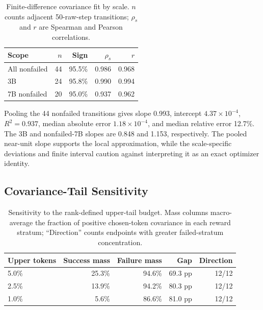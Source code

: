 \documentclass[letterpaper]{article}
\begin{document}
\begin{table}[t]
\centering
\small
\setlength{\tabcolsep}{3.1pt}
\begin{tabular*}{\columnwidth}{@{\extracolsep{\fill}}lrrrr}
\toprule
Scope & \(n\) & Sign & \(\rho_s\) & \(r\)\\
\midrule
All nonfailed & 44 & 95.5\% & 0.986 & 0.968\\
3B & 24 & 95.8\% & 0.990 & 0.994\\
7B nonfailed & 20 & 95.0\% & 0.937 & 0.962\\
\bottomrule
\end{tabular*}
\caption{Finite-difference covariance fit by scale.  \(n\) counts adjacent
50-raw-step transitions; \(\rho_s\) and \(r\) are Spearman and Pearson
correlations.}
\label{tab:sup-cov-fit}
\end{table}

Pooling the 44 nonfailed transitions gives slope 0.993, intercept
\(4.37\times10^{-4}\), \(R^2=0.937\), median absolute error
\(1.18\times10^{-4}\), and median relative error 12.7\%.  The 3B and
nonfailed-7B slopes are 0.848 and 1.153, respectively.  The pooled near-unit
slope supports the local approximation, while the scale-specific deviations
and finite interval caution against interpreting it as an exact optimizer
identity.

\subsection{Covariance-Tail Sensitivity}

\begin{table}[t]
\centering
\small
\setlength{\tabcolsep}{3.1pt}
\begin{tabular*}{\columnwidth}{@{\extracolsep{\fill}}lrrrr@{}}
\toprule
Upper tokens & Success mass & Failure mass & Gap & Direction\\
\midrule
5.0\% & 25.3\% & 94.6\% & 69.3 pp & 12/12\\
2.5\% & 13.9\% & 94.2\% & 80.3 pp & 12/12\\
1.0\% & 5.6\% & 86.6\% & 81.0 pp & 12/12\\
\bottomrule
\end{tabular*}
\caption{Sensitivity to the rank-defined upper-tail budget.  Mass columns
macro-average the fraction of positive chosen-token covariance in each
reward stratum; ``Direction'' counts endpoints with greater failed-stratum
concentration.}
\label{tab:sup-cov-sensitivity}
\end{table}
\end{document}
